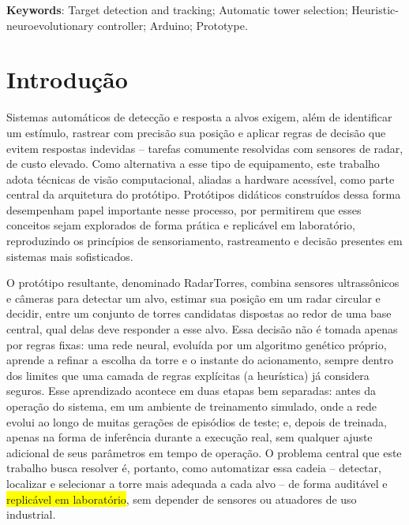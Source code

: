 \documentclass[12pt,a4paper]{article}
\newcommand{\grifo}[1]{\colorbox{yellow}{#1}}
\begin{document}
\noindent\textbf{Keywords}: Target detection and tracking; Automatic tower selection; Heuristic-neuroevolutionary controller; Arduino; Prototype.

\clearpage

\section{Introdução}

Sistemas automáticos de detecção e resposta a alvos exigem, além de identificar um estímulo,
rastrear com precisão sua posição e aplicar regras de decisão que evitem respostas indevidas --
tarefas comumente resolvidas com sensores de radar, de custo elevado. Como alternativa a esse tipo
de equipamento, este trabalho adota técnicas de visão computacional, aliadas a hardware acessível,
como parte central da arquitetura do protótipo. Protótipos didáticos construídos dessa forma
desempenham papel importante nesse processo, por permitirem que esses conceitos sejam explorados
de forma prática e replicável em laboratório, reproduzindo os princípios de sensoriamento,
rastreamento e decisão presentes em sistemas mais sofisticados.

O protótipo resultante, denominado RadarTorres, combina sensores ultrassônicos e câmeras para
detectar um alvo, estimar sua posição em um radar circular e decidir, entre um conjunto de torres
candidatas dispostas ao redor de uma base central, qual delas deve responder a esse alvo. Essa
decisão não é tomada apenas por regras fixas: uma rede neural, evoluída por um algoritmo genético
próprio, aprende a refinar a escolha da torre e o instante do acionamento, sempre dentro dos
limites que uma camada de regras explícitas (a heurística) já considera seguros. Esse aprendizado
acontece em duas etapas bem separadas: antes da operação do sistema, em um ambiente de treinamento
simulado, onde a rede evolui ao longo de muitas gerações de episódios de teste; e, depois de
treinada, apenas na forma de inferência durante a execução real, sem qualquer ajuste adicional de
seus parâmetros em tempo de operação. O problema central que este trabalho busca resolver é,
portanto, como automatizar essa cadeia -- detectar, localizar e selecionar a torre mais adequada a
cada alvo -- de forma auditável e \grifo{replicável em laboratório}, sem depender de sensores ou atuadores
de uso industrial.
\end{document}

